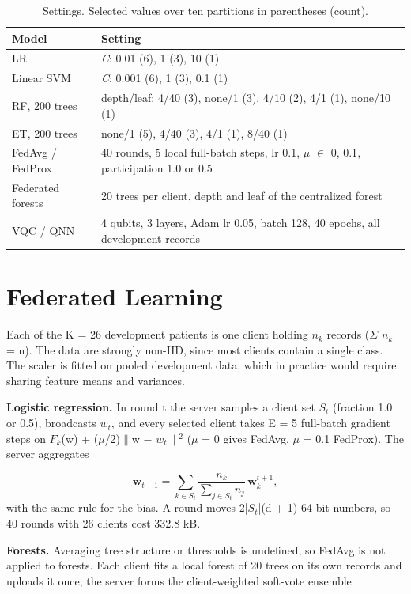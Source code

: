 \documentclass[conference,a4paper]{IEEEtran}
\begin{document}
\begin{table}[!t]\centering\caption{Settings. Selected values over ten partitions in parentheses (count).}\label{tab:hp}\scriptsize\setlength{\tabcolsep}{2pt}
\begin{tabular}{lp{6.2cm}}\toprule
Model & Setting\\\midrule
LR & \textit{C}: 0.01 (6), 1 (3), 10 (1)\\
Linear SVM & \textit{C}: 0.001 (6), 1 (3), 0.1 (1)\\
RF, 200 trees & depth/leaf: 4/40 (3), none/1 (3), 4/10 (2), 4/1 (1), none/10 (1)\\
ET, 200 trees & none/1 (5), 4/40 (3), 4/1 (1), 8/40 (1)\\
FedAvg / FedProx & 40 rounds, 5 local full-batch steps, lr 0.1, $\mu$ $\in$ {0, 0.1}, participation 1.0 or 0.5\\
Federated forests & 20 trees per client, depth and leaf of the centralized forest\\
VQC / QNN & 4 qubits, 3 layers, Adam lr 0.05, batch 128, 40 epochs, all development records\\
\bottomrule\end{tabular}\end{table}
\section{Federated Learning}
Each of the K = 26 development patients is one client holding $n_{k}$ records ($\Sigma$ $n_{k}$ = n). The data are strongly non-IID, since most clients contain a single class. The scaler is fitted on pooled development data, which in practice would require sharing feature means and variances.

\textbf{Logistic regression.} In round t the server samples a client set $S_{t}$ (fraction 1.0 or 0.5), broadcasts $w_{t}$, and every selected client takes E = 5 full-batch gradient steps on $F_{k}$(w) + ($\mu$/2)$\|$w $-$ $w_{t}$$\|$$^2$ ($\mu$ = 0 gives FedAvg, $\mu$ = 0.1 FedProx). The server aggregates

\begin{equation}\mathbf{w}_{t+1}=\sum_{k\in S_t}\frac{n_k}{\sum_{j\in S_t}n_j}\,\mathbf{w}_k^{t+1},\label{eq:fedavg}\end{equation}
with the same rule for the bias. A round moves 2|$S_{t}$|(d + 1) 64-bit numbers, so 40 rounds with 26 clients cost 332.8 kB.

\textbf{Forests.} Averaging tree structure or thresholds is undefined, so FedAvg is not applied to forests. Each client fits a local forest of 20 trees on its own records and uploads it once; the server forms the client-weighted soft-vote ensemble
\end{document}
